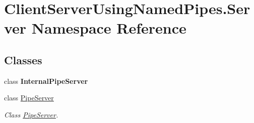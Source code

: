 \hypertarget{namespace_client_server_using_named_pipes_1_1_server}{}\section{Client\+Server\+Using\+Named\+Pipes.\+Server Namespace Reference}
\label{namespace_client_server_using_named_pipes_1_1_server}
\subsection*{Classes}
\begin{DoxyCompactItemize}
\item 
class {\bfseries Internal\+Pipe\+Server}
\item 
class \hyperlink{class_client_server_using_named_pipes_1_1_server_1_1_pipe_server}{Pipe\+Server}
\begin{DoxyCompactList}\small\item\em Class \hyperlink{class_client_server_using_named_pipes_1_1_server_1_1_pipe_server}{Pipe\+Server}. \end{DoxyCompactList}\end{DoxyCompactItemize}
